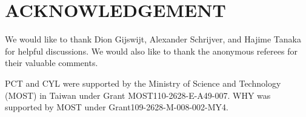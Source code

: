 \documentclass[final,onecolumn]{IEEEtran}
\theoremstyle{definition}
\newcommand{\cP}{{\mathcal P}}
\begin{document}
\section*{ACKNOWLEDGEMENT}
	
We would like to thank Dion Gijswijt, Alexander Schrijver, and Hajime Tanaka for helpful discussions. We would also like to thank the anonymous referees for their valuable comments.

PCT and CYL were supported by the Ministry of Science and Technology (MOST) in Taiwan under Grant MOST110-2628-E-A49-007. WHY was supported by MOST under Grant109-2628-M-008-002-MY4.

\end{document}
